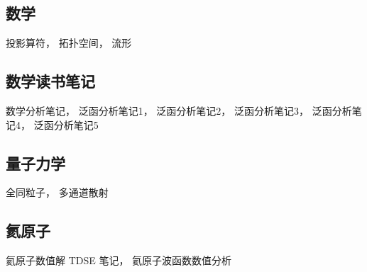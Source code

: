 
\subsection{数学}
投影算符， 拓扑空间， 流形

\subsection{数学读书笔记}
数学分析笔记， 泛函分析笔记1， 泛函分析笔记2， 泛函分析笔记3， 泛函分析笔记4， 泛函分析笔记5

\subsection{量子力学}
全同粒子， 多通道散射

\subsection{氦原子}
氦原子数值解 TDSE 笔记， 氦原子波函数数值分析
